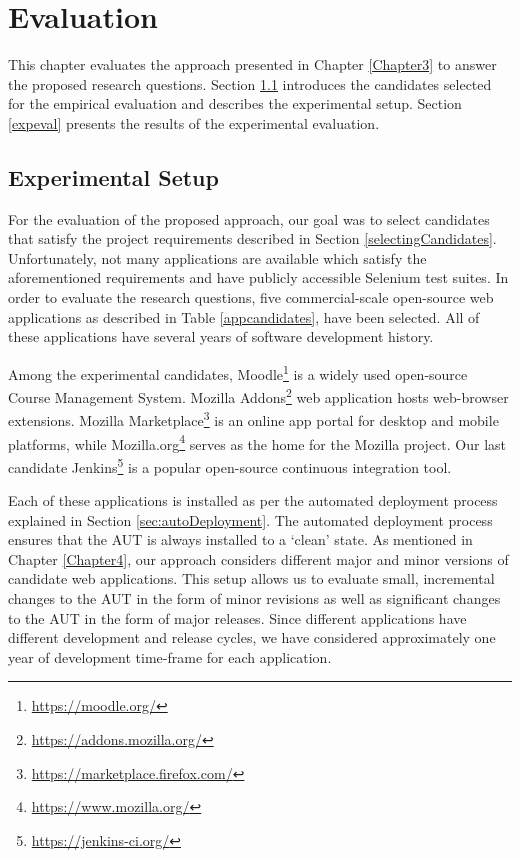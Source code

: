 \chapter{Evaluation} %

\label{Chapter6} %

This chapter evaluates the approach presented in Chapter \ref{Chapter3} to answer the proposed research questions. Section \ref{evalsetup} introduces the candidates selected for the empirical evaluation and describes the experimental setup. Section \ref{expeval} presents the results of the experimental evaluation.  

\section{Experimental Setup}
\label{evalsetup}
For the evaluation of the proposed approach, our goal was to select candidates that satisfy the project requirements described in Section \ref{selectingCandidates}. Unfortunately, not many applications are available which satisfy the aforementioned requirements and have publicly accessible Selenium test suites. In order to evaluate the research questions, five commercial-scale open-source web applications as described in Table \ref{appcandidates}, have been selected. All of these applications have several years of software development history.

Among the experimental candidates, Moodle\footnote{\url{https://moodle.org/}} is a widely used open-source Course Management System. Mozilla Addons\footnote{\url{https://addons.mozilla.org/}} web application hosts web-browser extensions. Mozilla Marketplace\footnote{\url{https://marketplace.firefox.com/}} is an online app portal for desktop and mobile platforms, while Mozilla.org\footnote{\url{https://www.mozilla.org/}} serves as the home for the Mozilla project. Our last candidate Jenkins\footnote{\url{https://jenkins-ci.org/}} is a popular open-source continuous integration tool. 
  
Each of these applications is installed as per the automated deployment process explained in Section \ref{sec:autoDeployment}. The automated deployment process ensures that the AUT is always installed to a `clean' state. As mentioned in Chapter \ref{Chapter4}, our approach considers different major and minor versions of candidate web applications. This setup allows us to evaluate small, incremental changes to the AUT in the form of minor revisions as well as  significant changes to the AUT in the form of major releases. 
Since different applications have different development and release cycles, we have considered approximately one year of development time-frame for each application. 

